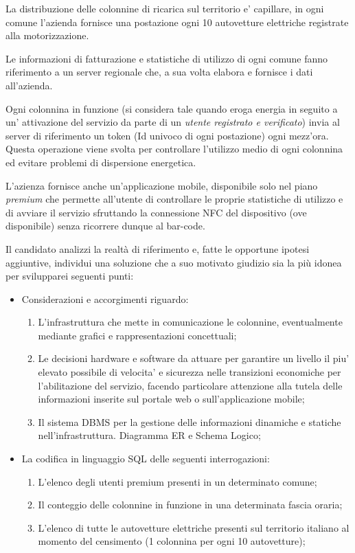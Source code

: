\documentclass[a4paper,12pt]{article}
\begin{document}
La distribuzione delle colonnine di ricarica sul territorio e' capillare, in
ogni comune l'azienda fornisce una postazione ogni 10 autovetture elettriche 
registrate alla motorizzazione.

Le informazioni di fatturazione e statistiche di utilizzo di ogni comune fanno
riferimento a un server regionale che, a sua volta elabora e fornisce 
i dati all'azienda.

Ogni colonnina in funzione (si considera tale quando eroga energia in seguito a
un' attivazione del servizio da parte di un \textit{utente registrato 
e verificato}) invia al server di riferimento un token (Id univoco di ogni 
postazione) ogni mezz'ora.\\ Questa operazione viene svolta per controllare
l'utilizzo medio di ogni colonnina ed evitare problemi di dispersione
energetica.

L'azienza fornisce anche un'applicazione mobile, disponibile solo nel
piano \textit{premium} che permette all'utente di controllare le proprie
statistiche di utilizzo e di avviare il servizio sfruttando la connessione NFC
del dispositivo (ove disponibile) senza ricorrere dunque al bar-code.

Il candidato analizzi la realtà di riferimento e, fatte le opportune ipotesi 
aggiuntive, individui una
soluzione che a suo motivato giudizio sia la più idonea 
per svilupparei seguenti punti: 

\begin{itemize}
\item Considerazioni e accorgimenti riguardo:
\begin{enumerate}
\item L'infrastruttura che mette in comunicazione le colonnine, eventualmente
mediante grafici e rappresentazioni concettuali;
\item Le decisioni hardware e software da attuare per garantire 
un livello il piu' elevato possibile di velocita' e sicurezza nelle transizioni
economiche per l'abilitazione del servizio, facendo particolare attenzione
alla tutela delle informazioni inserite sul portale web o sull'applicazione 
mobile;
\item Il sistema DBMS per la gestione delle informazioni dinamiche e statiche
nell'infrastruttura. Diagramma ER e Schema Logico;
\end{enumerate}
\item La codifica in linguaggio SQL delle seguenti interrogazioni:
\begin{enumerate}
\item L'elenco degli utenti premium presenti in un determinato comune;
\item Il conteggio delle colonnine in funzione in una determinata fascia oraria;
\item L'elenco di tutte le autovetture elettriche presenti sul territorio 
italiano al momento del censimento (1 colonnina per ogni 10 autovetture);
\end{enumerate}
\end{itemize}
\end{document}
